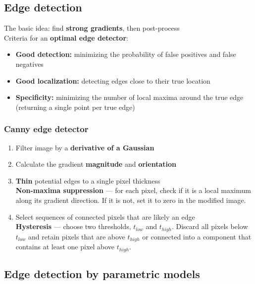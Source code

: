 \documentclass{article}
\begin{document}
    \subsection{Edge detection}
    The basic idea: find \textbf{strong gradients}, then post-process \\
    Criteria for an \textbf{optimal edge detector}:
    \begin{itemize}
        \item \textbf{Good detection:} minimizing the probability of false positives and false negatives
        \item \textbf{Good localization:} detecting edges close to their true location
        \item \textbf{Specificity:} minimizing the number of local maxima around the true edge (returning a single point per true edge)
    \end{itemize}

        \subsubsection{Canny edge detector}
        \begin{enumerate}
            \item Filter image by a \textbf{derivative of a Gaussian}
            \item Calculate the gradient \textbf{magnitude} and \textbf{orientation}
            \item \textbf{Thin} potential edges to a single pixel thickness \\
            \textbf{Non-maxima suppression} --- for each pixel, check if it is a local maximum along its gradient direction. If it is not, set it to zero in the modified image.
            \item Select sequences of connected pixels that are likely an edge \\
            \textbf{Hysteresis} --- choose two thresholds, $t_{low}$ and $t_{high}$. Discard all pixels below $t_{low}$ and retain pixels that are above $t_{high}$ or connected into a component that contains at least one pixel above $t_{high}$.
        \end{enumerate}

        \noindent
        
    \subsection{Edge detection by parametric models}
\end{document}
